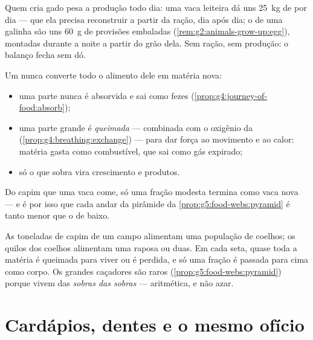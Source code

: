 \begin{example}\label{ex:g6:matter-from-food:weighing}
Quem cria gado pesa a produção todo dia: uma vaca leiteira dá uns
\qty{25}{kg} de  por dia ---  que ela precisa
reconstruir a partir da ração, dia após dia; o  de uma galinha são
uns \qty{60}{g} de provisões embaladas
(\cref{rem:g2:animals-grow-up:egg}), montadas durante a noite a partir
do grão dela. Sem ração, sem produção: o balanço fecha sem dó.
\end{example}

\begin{proposition}\label{prop:g6:matter-from-food:losses}
Um  nunca converte todo o alimento dele em matéria nova:
\begin{itemize}
  \item uma parte nunca é absorvida e sai como fezes
        (\cref{prop:g4:journey-of-food:absorb});
  \item uma parte grande é \emph{queimada} --- combinada com o
        oxigênio da 
        (\cref{prop:g4:breathing:exchange}) --- para dar força ao
        movimento e ao calor: matéria gasta como combustível, que sai
        como gás expirado;
  \item só o que sobra vira crescimento e produtos.
\end{itemize}
Do capim que uma vaca come, só uma fração modesta termina como vaca
nova --- e é por isso que cada andar da pirâmide da
\cref{prop:g5:food-webs:pyramid} é tanto menor que o de baixo.
\end{proposition}
\admitted

\begin{example}\label{ex:g6:matter-from-food:pyramid}
As toneladas de capim de um campo alimentam uma população de coelhos;
os quilos dos coelhos alimentam uma raposa ou duas. Em cada seta,
quase toda a matéria é queimada para viver ou é perdida, e só uma
fração é passada para cima como corpo. Os grandes caçadores são raros
(\cref{prop:g5:food-webs:pyramid}) porque vivem das \emph{sobras das
sobras} --- aritmética, e não azar.
\end{example}

\section{Cardápios, dentes e o mesmo ofício}

